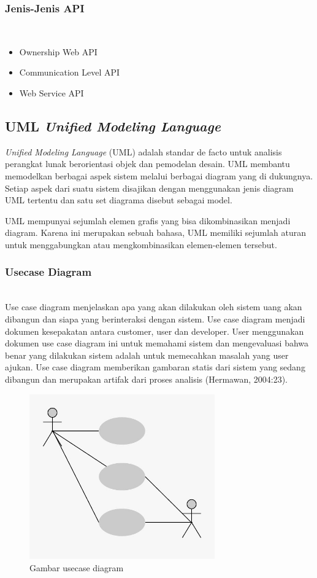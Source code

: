 \subsubsection{Jenis-Jenis API}
\hfil\\
\begin{itemize}
	\item Ownership Web API
	\item Communication Level API
	\item Web Service API
\end{itemize}

\subsection{UML \textit{Unified Modeling Language}}
\textit{Unified Modeling Language} (UML) adalah standar de facto untuk analisis perangkat lunak berorientasi objek dan pemodelan desain. UML membantu memodelkan berbagai aspek sistem melalui berbagai diagram yang di dukungnya. Setiap aspek dari suatu sistem disajikan dengan menggunakan jenis diagram UML tertentu dan satu set diagrama disebut sebagai model.

UML mempunyai sejumlah elemen grafis yang bisa dikombinasikan menjadi diagram. Karena ini merupakan sebuah bahasa, UML memiliki sejumlah aturan untuk menggabungkan atau mengkombinasikan elemen-elemen tersebut.

\subsubsection{Usecase Diagram}
\hfill\\
Use case diagram menjelaskan apa yang akan dilakukan oleh sistem uang akan dibangun dan siapa yang berinteraksi dengan sistem. Use case diagram menjadi dokumen kesepakatan antara customer, user dan developer. User menggunakan dokumen use case diagram ini untuk memahami sistem dan mengevaluasi bahwa benar yang dilakukan sistem adalah untuk memecahkan masalah yang user ajukan. Use case diagram memberikan gambaran statis dari sistem yang sedang dibangun dan merupakan artifak dari proses analisis (Hermawan, 2004:23).
	\begin{figure}[H]
		\includegraphics[width=8cm]{figures/usecase.jpg}
		\centering
		\caption{Gambar usecase diagram}
	\end{figure}
	
